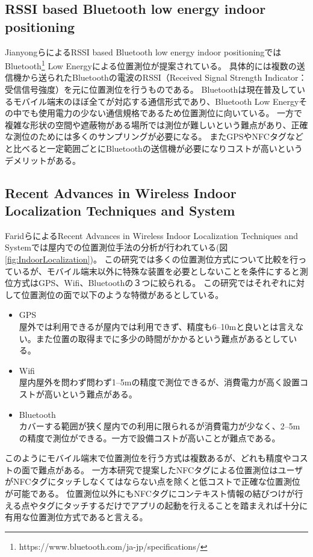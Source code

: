 \subsection{RSSI based Bluetooth low energy indoor positioning}
JianyongらによるRSSI based Bluetooth low energy indoor positioning\cite{7275525}ではBluetooth\footnote{\textsf{https://www.bluetooth.com/ja-jp/specifications/}} Low Energyによる位置測位が提案されている。
具体的には複数の送信機から送られたBluetoothの電波のRSSI（Received Signal Strength Indicator：受信信号強度）を元に位置測位を行うものである。
Bluetoothは現在普及しているモバイル端末のほぼ全てが対応する通信形式であり、Bluetooth Low Energyその中でも使用電力の少ない通信規格であるため位置測位に向いている。
一方で複雑な形状の空間や遮蔽物がある場所では測位が難しいという難点があり、正確な測位のためには多くのサンプリングが必要になる。
またGPSやNFCタグなどと比べると一定範囲ごとにBluetoothの送信機が必要になりコストが高いというデメリットがある。


\subsection{Recent Advances in Wireless Indoor Localization Techniques and System}
FaridらによるRecent Advances in Wireless Indoor Localization Techniques and System\cite{Farid2013}では屋内での位置測位手法の分析が行われている(図\ref{fig:IndoorLocalization})。
この研究では多くの位置測位方式について比較を行っているが、モバイル端末以外に特殊な装置を必要としないことを条件にすると測位方式はGPS、Wifi、Bluetoothの３つに絞られる。
この研究ではそれぞれに対して位置測位の面で以下のような特徴があるとしている。
\begin{itemize} 
  \item GPS\\
    屋外では利用できるが屋内では利用できず、精度も6--10mと良いとは言えない。また位置の取得までに多少の時間がかかるという難点があるとしている。
  \item Wifi\\
    屋内屋外を問わず問わず1--5mの精度で測位できるが、消費電力が高く設置コストが高いという難点がある。
  \item Bluetooth\\
    カバーする範囲が狭く屋内での利用に限られるが消費電力が少なく、2--5mの精度で測位ができる。一方で設備コストが高いことが難点である。
\end{itemize}
このようにモバイル端末で位置測位を行う方式は複数あるが、どれも精度やコストの面で難点がある。
一方本研究で提案したNFCタグによる位置測位はユーザがNFCタグにタッチしなくてはならない点を除くと低コストで正確な位置測位が可能である。
位置測位以外にもNFCタグにコンテキスト情報の結びつけが行える点やタグにタッチするだけでアプリの起動を行えることを踏まえれば十分に有用な位置測位方式であると言える。

